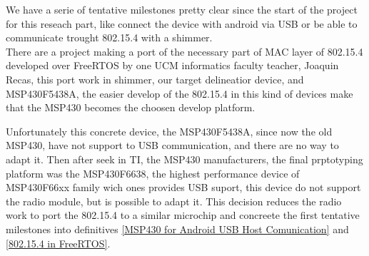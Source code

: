 
	We have a serie of tentative milestones pretty clear since the start of the project for this reseach part, like connect the device with android via USB or be able to communicate trought 802.15.4 with a shimmer.\\

	There are a project making a port of the necessary part of MAC layer of 802.15.4 developed over FreeRTOS by one UCM informatics faculty teacher, Joaquin Recas, this port work in shimmer, our target delineatior device, and MSP430F5438A, the easier develop of the 802.15.4 in this kind of devices make that the MSP430 becomes the choosen develop platform.\\


	Unfortunately this concrete device, the MSP430F5438A, since now the old MSP430, have not support to USB communication, and there are no way to adapt it. Then after seek in TI, the MSP430 manufacturers, the final prptotyping platform was the MSP430F6638, the highest performance device of MSP430F66xx family wich ones provides USB suport, this device do not support the radio module, but is possible to adapt it. This decision reduces the radio work to port the 802.15.4 to a similar microchip and concreete the first tentative milestones into definitives \autoref{MSP430 for Android USB Host Comunication} and \autoref{802.15.4 in FreeRTOS}. \\

